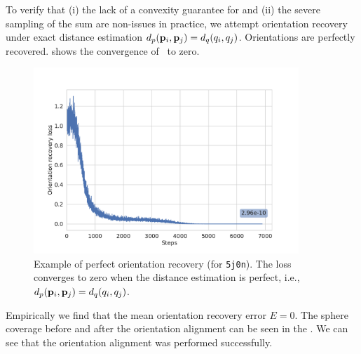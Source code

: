 
To verify that (i) the lack of a convexity guarantee for  and (ii) the severe sampling of the sum are non-issues in practice, we attempt orientation recovery under exact distance estimation $d_p(\mathbf{p}_i, \mathbf{p}_j) = d_q(q_i, q_j)$.
Orientations are perfectly recovered.
 shows the convergence of~ to zero.

\begin{figure}[ht!]
    \centering
        \includegraphics[height=7cm]{figures/5j0n_perfect_angle_recovery}
    \caption{
        Example of perfect orientation recovery (for \texttt{5j0n}).
        The loss~ converges to zero when the distance estimation is perfect, i.e., $d_p(\mathbf{p}_i, \mathbf{p}_j) = d_q(q_i, q_j)$.
    }\label{fig:5j0n-orientation-recovery-loss}
\end{figure}

Empirically we find that the mean orientation recovery error  $E = 0$.
The sphere coverage before and after the orientation alignment can be seen in the .
We can see that the orientation alignment was performed successfully.

